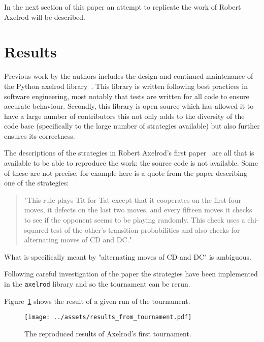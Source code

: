 \documentclass[a4paper]{article}
\begin{document}
In the next section of this paper an attempt to replicate the work of Robert
Axelrod will be described.

\section{Results}

Previous work by the authors includes the design and continued maintenance
of the Python axelrod library~\cite{knight2016open}. This library is written following best
practices in software engineering, most notably that tests are written for all
code to ensure accurate behaviour. Secondly, this library is open source which
has allowed it to have a large number of contributors this not only adds to the
diversity of the code base (specifically to the large number of strategies
available) but also further ensures its correctness.

The descriptions of the strategies in Robert Axelrod's first
paper~\cite{axelrod1980effective} are
all that is available to be able to reproduce the work: the source code is not
available. Some of these are not precise, for example here is a quote from the
paper describing one of the strategies:

\begin{quote}
"This rule plays Tit for Tat except that it cooperates on the first four moves,
it defects on the last two moves, and every fifteen moves it checks to see
if the opponent seems to be playing randomly. This check uses a chi-squared
test of the other’s transition probabilities and also checks for alternating
moves of CD and DC."
\end{quote}

What is specifically meant by "alternating moves of CD and DC" is ambiguous.

Following careful investigation of the paper the strategies have been
implemented in the \texttt{axelrod} library and so the tournament
can be rerun.

Figure~\ref{fig:results_from_tournament} shows the result of a given run of the
tournament.

\begin{figure}[!htbp]
    \begin{center}
        \texttt{[image: ../assets/results\_from\_tournament.pdf]}
    \end{center}
    \caption{The reproduced results of Axelrod's first tournament.}
    \label{fig:results_from_tournament}
\end{figure}
\end{document}

